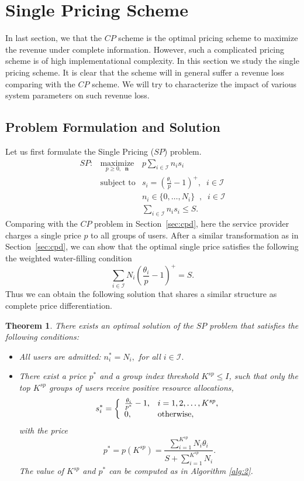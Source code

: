 \documentclass[twocolumn,10pt,twosided]{IEEEtran}
\newtheorem{theorem}{Theorem}
\begin{document}
\section{Single Pricing Scheme}
\label{sec:single_price}
In last section, we  that the $CP$ scheme is the optimal pricing scheme to maximize the revenue under complete
information. However, such a complicated pricing scheme is of high implementational complexity. In this section we study the single pricing scheme. It is clear that the scheme will in general suffer a revenue loss comparing with the $CP$ scheme. We will try to characterize the impact of various system parameters on such revenue loss.

\subsection{Problem Formulation and Solution}
Let us first formulate the Single Pricing ($SP$) problem.
\begin{eqnarray*}
    SP:& \underset{p\ge 0,\;\; \boldsymbol{n}}{\text{maximize}} & p\sum\limits_{i\in\mathcal{I}} n_is_{i} \nonumber\\
    &\text{subject to}& s_i =\left(\frac{\theta_i }{p} - 1\right)^+,\;\; i\in\mathcal{I} \label{r_sp}\\
    &&n_i \in\{0,\ldots,N_{i}\} \;\;,\;\;  i\in\mathcal{I}\nonumber\\
    &&\sum\limits_{i\in\mathcal{I}} n_i s_{i} \le S. \label{r_c}
\end{eqnarray*}
Comparing with the $CP$ problem in Section~\ref{sec:cpd}, here the service provider charges a single price $p$ to all groups of users. After a similar transformation as in Section~\ref{sec:cpd}, we can show that the optimal single price satisfies the following the weighted water-filling condition
\begin{equation*}
    \sum\limits_{i\in\mathcal{I}} N_i \left(\frac{\theta_i}{p}-1\right)^+ = S.
\end{equation*}
Thus we can obtain the following solution that shares a similar structure as complete price differentiation.
\begin{theorem}\label{thm:sp}
There exists an optimal solution of the $SP$ problem that satisfies the following conditions:
\begin{itemize}
    \item All users are admitted: $n^*_i=N_i,$ for all $i\in\mathcal{I}.$
    \item There exist a price $p^*$ and a group index threshold $K^{sp} \leq I$, such that only the top $K^{sp}$ groups of users receive positive resource allocations,
$$s^*_i= \left\{{\begin{array}{ll}
  \frac{\theta_i}{p^*}-1, & i=1,2,\dots,K^{sp},\\
  0, & {\rm{otherwise}} , \\
\end{array}} \right.$$
with the price
$$p^*=p(K^{sp})=\frac{\sum_{i=1}^{K^{sp}} N_i \theta_i}{S+\sum_{i=1}^{K^{sp}}N_i}.$$  The value of $K^{sp}$ and $p^*$ can be computed as in Algorithm \ref{alg:2}.
\end{itemize}
\end{theorem}
\end{document}
